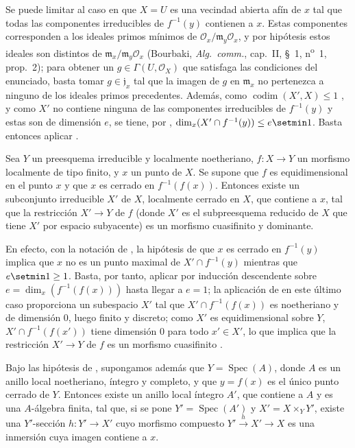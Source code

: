Se puede limitar al caso en que $X=U$ es una vecindad abierta afín de $x$ tal que todas las componentes irreducibles de $f^{-1}(y)$ contienen a $x$.
Estas componentes corresponden a los ideales primos mínimos de $\mathcal O_x/\mathfrak m_y\mathcal O_x$, y por hipótesis estos ideales son distintos de $\mathfrak m_x/\mathfrak m_y\mathcal O_x$ (Bourbaki, \emph{Alg.\ comm.}, cap.~II, \S~1, n\textsuperscript{o}~1, prop.~2); para obtener un $g\in\Gamma(U,\mathcal O_X)$ que satisfaga las condiciones del enunciado, basta tomar $g\in\mathfrak j_x$ tal que la imagen de $g$ en $\mathfrak m_x$ no pertenezca a ninguno de los ideales primos precedentes.
Además, como $\operatorname{codim}(X',X)\leq 1$ , y como $X'$ no contiene ninguna de las componentes irreducibles de $f^{-1}(y)$ y estas son de dimensión $e$, se tiene, por , $\dim_x(X'\cap f^{-1}(y))\leq e\setmin 1$.
Basta entonces aplicar .

\begin{proposition}[14.5.3]
\label{IV.14.5.3}
Sea $Y$ un preesquema irreducible y localmente noetheriano, $f:X\to Y$ un morfismo localmente de tipo finito, y $x$ un punto de $X$.
Se supone que $f$ es equidimensional en el punto $x$ y que $x$ es cerrado en $f^{-1}(f(x))$.
Entonces existe un subconjunto irreducible $X'$ de $X$, localmente cerrado en $X$, que contiene a $x$, tal que la restricción $X'\to Y$ de $f$ \textup{(donde $X'$ es el subpreesquema reducido de $X$ que tiene $X'$ por espacio subyacente)} es un morfismo cuasifinito y dominante.
\end{proposition}

En efecto, con la notación de , la hipótesis de que $x$ es cerrado en $f^{-1}(y)$ implica que $x$ no es un punto maximal de $X'\cap f^{-1}(y)$ mientras que $e\setmin 1\geq 1$.
Basta, por tanto, aplicar  por inducción descendente sobre $e=\dim_x(f^{-1}(f(x)))$ hasta llegar a $e=1$; la aplicación de  en este último caso proporciona un subespacio $X'$ tal que $X'\cap f^{-1}(f(x))$ es noetheriano y de dimensión 0, luego finito y discreto; como $X'$ es equidimensional sobre $Y$, $X'\cap f^{-1}(f(x'))$ tiene dimensión 0 para todo $x'\in X'$, lo que implica que la restricción $X'\to Y$ de $f$ es un morfismo cuasifinito .

\begin{corollary}[14.5.4]
\label{IV.14.5.4}
Bajo las hipótesis de , supongamos además que $Y=\operatorname{Spec}(A)$, donde $A$ es un anillo local noetheriano, íntegro y \textup{completo}, y que $y=f(x)$ es el único punto cerrado de $Y$.
Entonces existe un anillo local íntegro $A'$, que contiene a $A$ y es una $A$-álgebra finita, tal que, si se pone $Y'=\operatorname{Spec}(A')$ y $X'=X\times_Y Y'$, existe una $Y'$-sección $h:Y'\to X'$ cuyo morfismo compuesto $Y'\xrightarrow{h}X'\to X$ es una inmersión cuya imagen contiene a $x$.
\end{corollary}

